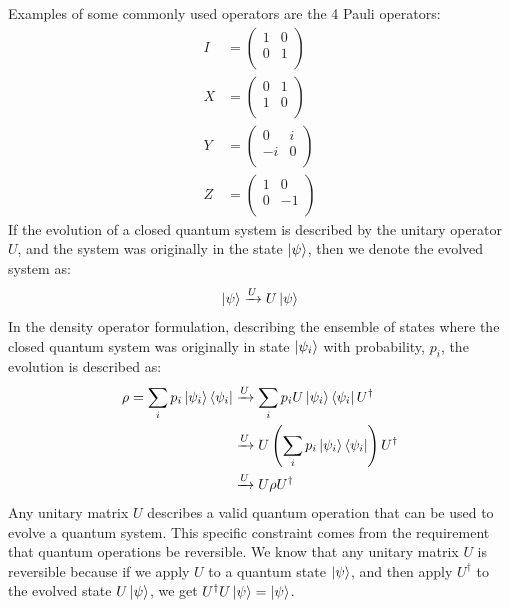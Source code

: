 Examples of some commonly used operators are the 4 Pauli operators:
\begin{align}
    I &= \begin{pmatrix}
        1 & 0 \\ 
        0 & 1 \\ 
    \end{pmatrix} \\ 
    X &= \begin{pmatrix}
        0 & 1 \\ 
        1 & 0 \\ 
    \end{pmatrix} \\ 
    Y &= \begin{pmatrix}
        0 & i \\ 
        -i & 0 \\ 
    \end{pmatrix} \\ 
    Z &= \begin{pmatrix}
        1 & 0 \\ 
        0 & -1 \\ 
    \end{pmatrix}
\end{align}
If the evolution of a closed quantum system is described by the unitary operator $U$, and the system was originally in the state $\ket{\psi}$, then we denote the evolved system as:
\begin{align}
    \ket{\psi} \xrightarrow{U} U \ket{\psi}
\end{align}
In the density operator formulation, describing the ensemble of states where the closed quantum system was originally in state $\ket{\psi_i}$ with probability, $p_i$, the evolution is described as:
\begin{align}
    \rho = \sum_i p_i \ket{\psi_i}\bra{\psi_i} &\xrightarrow{U} \sum_i p_i U\ket{\psi_i}\bra{\psi_i}U^{\dagger} \\
    &\xrightarrow{U} U \left(\sum_i p_i \ket{\psi_i}\bra{\psi_i} \right)U^{\dagger} \\
    &\xrightarrow{U} U \rho U^{\dagger}
\end{align}
Any unitary matrix $U$ describes a valid quantum operation that can be used to evolve a quantum system. This specific constraint comes from the requirement that quantum operations be reversible. We know that any unitary matrix $U$ is reversible because if we apply $U$ to a quantum state $\ket{\psi}$, and then apply $U^{\dagger}$ to the evolved state $U\ket{\psi}$, we get $U^{\dagger}U\ket{\psi} = \ket{\psi}$.

